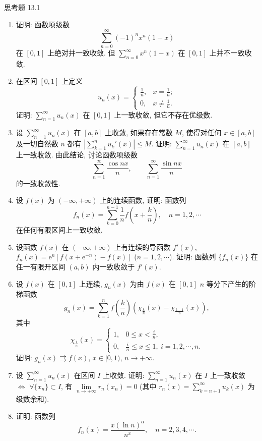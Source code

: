 \begin{exblock}{思考题 13.1}
\begin{enumerate}
  如果删去 ``$f_{n}(x)$ 与 $g_{n}(x)$ 有界'' 的条件, 结论是否还成立, 试举例说明之.
  \item 证明: 函数项级数
  \[
    \sum_{n=0}^{\infty}(-1)^{n}x^{n}(1-x)
\]
  在 $[0,1]$ 上绝对并一致收敛. 但 $\sum_{n=0}^{\infty}x^{n}(1-x)$ 在 $[0,1]$ 上并不一致收敛.
  \item 在区间 $[0,1]$ 上定义
  \[
    u_{n}(x)=\begin{cases}
      \frac{1}{n}, & x=\frac{1}{n};\\
      0, & x\neq\frac{1}{n}.
\end{cases}
\]
  证明: $\sum_{n=1}^{\infty}u_{n}(x)$ 在 $[0,1]$ 上一致收敛, 但它不存在优级数.
  \item 设 $\sum_{n=1}^{\infty}u_{n}(x)$ 在 $[a,b]$ 上收敛, 如果存在常数 $M$, 使得对任何 $x\in[a,b]$ 及一切自然数 $n$ 都有 $\left|\sum_{k=1}^{n}u_{k}'(x)\right|\leqslant M$. 证明: $\sum_{n=1}^{\infty}u_{n}(x)$ 在 $[a,b]$ 上一致收敛. 由此结论, 讨论函数项级数
  \[
    \sum_{n=1}^{\infty}\frac{\cos nx}{n},\qquad\sum_{n=1}^{\infty}\frac{\sin nx}{n}
\]
  的一致收敛性.
  \item 设 $f(x)$ 为 $(-\infty,+\infty)$ 上的连续函数, 证明: 函数列
  \[
    f_{n}(x)=\sum_{k=0}^{n-1}\frac{1}{n}f\left(x+\frac{k}{n}\right),\quad n=1,2,\cdots
\]
  在任何有限区间上一致收敛.
  \item 设函数 $f(x)$ 在 $(-\infty,+\infty)$ 上有连续的导函数 $f'(x)$, $f_{n}(x)=\mathrm{e}^{n}[f(x+\mathrm{e}^{-n})-f(x)]$ ($n=1,2,\cdots$). 证明: 函数列 $\{f_{n}(x)\}$ 在任一有限开区间 $(a,b)$ 内一致收敛于 $f'(x)$.
  \item 设 $f(x)$ 在 $[0,1]$ 上连续, $g_{n}(x)$ 为由 $f(x)$ 在 $[0,1]$ $n$ 等分下产生的阶梯函数
  \[
    g_{n}(x)=\sum_{k=1}^{n}f\left(\frac{k}{n}\right)\left(\chi_{\frac{k}{n}}(x)-\chi_{\frac{k-1}{n}}(x)\right),
\]
  其中
  \[
    \chi_{\frac{i}{n}}(x)=\begin{cases}
      1, & 0\leqslant x<\frac{i}{n},\\
      0, & \frac{i}{n}\leqslant x\leqslant1,\ i=1,2,\cdots,n.
\end{cases}
\]
  证明: $g_{n}(x)\rightrightarrows f(x)$, $x\in[0,1)$, $n\to+\infty$.
  \item 设 $\sum_{n=1}^{\infty}u_{n}(x)$ 在区间 $I$ 上收敛. 证明: $\sum_{n=1}^{\infty}u_{n}(x)$ 在 $I$ 上一致收敛 $\Leftrightarrow$ $\forall\{x_{n}\}\subset I$, 有 $\lim\limits_{n\to+\infty}r_{n}(x_{n})=0$ (其中 $r_{n}(x)=\sum_{k=n+1}^{\infty}u_{k}(x)$ 为级数余和).
  \item 证明: 函数列
  \[
    f_{n}(x)=\frac{x(\ln n)^{\alpha}}{n^{x}},\quad n=2,3,4,\cdots.
\]
\end{enumerate}
\end{exblock}
